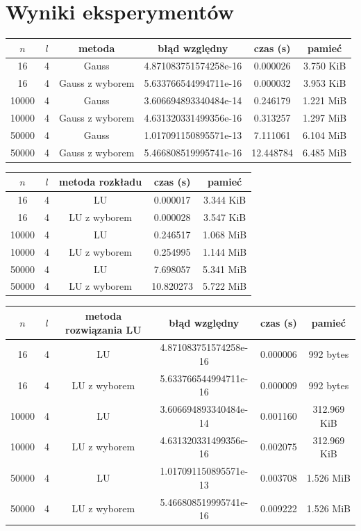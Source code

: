\documentclass[]{article}
\begin{document}
\section{Wyniki eksperymentów}
\begin{table}[h]
	\centering
	\begin{tabular}{|c c c c c c|} 
		\hline
		$n$ & $l$ & metoda & błąd względny & czas (s) & pamieć\\
		\hline\hline
		16 & 4 & Gauss & 4.871083751574258e-16 & 0.000026 & 3.750 KiB \\
		16 & 4 & Gauss z wyborem & 5.633766544994711e-16 & 0.000032 & 3.953 KiB \\
		10000 & 4 & Gauss & 3.606694893340484e-14 & 0.246179 & 1.221 MiB \\
		10000 & 4 & Gauss z wyborem & 4.631320331499356e-16 & 0.313257 & 1.297 MiB\\
		50000 & 4 & Gauss & 1.017091150895571e-13 & 7.111061 & 6.104 MiB \\
		50000 & 4 & Gauss z wyborem & 5.466808519995741e-16 &  12.448784 & 6.485 MiB \\
		\hline
	\end{tabular}
\end{table}

\begin{table}[h]
	\centering
	\begin{tabular}{|c c c c c|} 
		\hline
		$n$ & $l$ & metoda rozkładu & czas (s) & pamieć\\
		\hline\hline
		16 & 4 & LU  &  0.000017 & 3.344 KiB \\
		16 & 4 & LU z wyborem & 0.000028 & 3.547  KiB \\
		10000 & 4 & LU  & 0.246517 & 1.068 MiB \\
		10000 & 4 & LU z wyborem  & 0.254995 & 1.144 MiB\\
		50000 & 4 & LU  & 7.698057 & 5.341 MiB \\
		50000 & 4 & LU z wyborem &  10.820273 &  5.722 MiB \\
		\hline
	\end{tabular}
\end{table}

\begin{table}[h]
	\centering
	\begin{tabular}{|c c c c c c|} 
		\hline
		$n$ & $l$ & metoda rozwiązania LU & błąd względny & czas (s) & pamieć\\
		\hline\hline
		16 & 4 & LU & 4.871083751574258e-16 &  0.000006 & 992 bytes\\
		16 & 4 & LU z wyborem & 5.633766544994711e-16 & 0.000009 & 992 bytes \\
		10000 & 4 & LU & 3.606694893340484e-14 & 0.001160 & 312.969 KiB\\
		10000 & 4 & LU z wyborem & 4.631320331499356e-16 & 0.002075  & 312.969 KiB\\
		50000 & 4 & LU & 1.017091150895571e-13 & 0.003708 & 1.526 MiB \\
		50000 & 4 & LU z wyborem & 5.466808519995741e-16 &  0.009222 & 1.526 MiB \\
		\hline
	\end{tabular}
\end{table}
\end{document}
